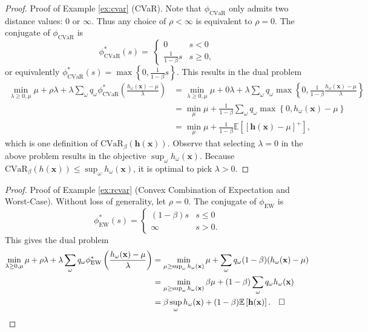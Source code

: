 \documentclass[opre,nonblindrev]{informs3} %
\newcommand{\E}{\mathbb{E}}
\newcommand{\e}[1]{\E \left[ #1 \right]}
\newcommand{\x}{\mathbf{x}}
\renewcommand{\h}{\mathbf{h}}
\begin{document}
\begin{APPENDICES}
\begin{proof}{\sc Proof of Example \ref{ex:cvar} (CVaR).}
%	
	Note that $\phi_{\text{CVaR}}$ only admits two distance values: $0$ or $\infty$.
	Thus any choice of $\rho < \infty$ is equivalent to $\rho = 0$.
	The conjugate of $\phi_{\text{CVaR}}$ is
	\[
	\phi_{\text{CVaR}}^*(s) = \
		\begin{cases}
			0 & s < 0 \\
			\frac{1}{1-\beta} s & s \geq 0,
		\end{cases}
	\]
	or equivalently $\phi_{\text{CVaR}}^*(s) = \max\left\{0, \frac{1}{1-\beta} s \right\}$. 
	This results in the dual problem 
	\begin{align*}
		\min_{\lambda \geq 0,\mu} \mu + \rho \lambda + \lambda \sum_\omega q_\omega \phi_{\text{CVaR}}^*\left( \frac{h_\omega(\x)-\mu}{\lambda} \right) & = \min_{\lambda \geq 0, \mu} \mu + 0\lambda 
		 + \lambda \sum_\omega q_\omega \max\left\{ 0, \frac{1}{1-\beta} \frac{h_\omega(\x)-\mu}{\lambda} \right\} \\
		& = \min_{\mu} \mu + \frac{1}{1-\beta} \sum_\omega q_\omega \max\left\{ 0, h_\omega(\x)-\mu \right\} \\
		& = \min_{\mu} \mu + \frac{1}{1-\beta} \e{[\h(\x)-\mu]^+},
	\end{align*}
	which is one definition of $\text{CVaR}_\beta(\h(\x))$. 
	Observe that selecting $\lambda=0$ in the above problem results in the objective $\sup_\omega h_\omega(\x)$. 
	Because $\text{CVaR}_\beta(h(\x)) \leq \sup_\omega h_\omega(\x)$, it is optimal to pick $\lambda >0$. 
	\Halmos
\end{proof}


\begin{proof}{\sc Proof of Example \ref{ex:rcvar} (Convex Combination of Expectation and Worst-Case).}
	Without loss of generality, let $\rho = 0$.
	The conjugate of $\phi_{\text{EW}}$ is
	\[
		\phi_{\text{EW}}^*(s) =
		\begin{cases}
			(1-\beta) s & s \leq 0 \\
			\infty & s > 0.
		\end{cases}
	\]
	This gives the dual problem
	\begin{align*}
		\min_{\lambda \geq 0,\mu} \mu + \rho \lambda + \lambda \sum_\omega q_\omega \phi_{\text{EW}}^*\left(\frac{h_\omega(\x)-\mu}{\lambda}\right) & = \min_{\mu \geq \sup_\omega h_\omega(\x)} \mu + \sum_\omega q_\omega (1-\beta) (h_\omega(\x) - \mu) \\
		& = \min_{\mu \geq \sup_\omega h_\omega(\x)} \beta \mu + (1-\beta) \sum_\omega q_\omega h_\omega(\x) \\
		& = \beta \sup_\omega h_\omega(\x) + (1-\beta) \e{\h(\x)}. \halmos
	\end{align*}
\end{proof}



\end{APPENDICES}
\end{document}
